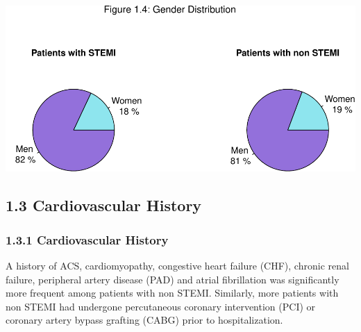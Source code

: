 \documentclass[
]{article}
\begin{document}
~

~

\includegraphics{ACSIS_2024_v1_pdf_files/figure-latex/unnamed-chunk-17-1.pdf}

\pagebreak

\subsection{1.3 Cardiovascular History}\label{cardiovascular-history}

\subsubsection{1.3.1 Cardiovascular
History}\label{cardiovascular-history-1}

A history of ACS, cardiomyopathy, congestive heart failure (CHF),
chronic renal failure, peripheral artery disease (PAD) and atrial
fibrillation was significantly more frequent among patients with non
STEMI. Similarly, more patients with non STEMI had undergone
percutaneous coronary intervention (PCI) or coronary artery bypass
grafting (CABG) prior to hospitalization.

~
\end{document}
